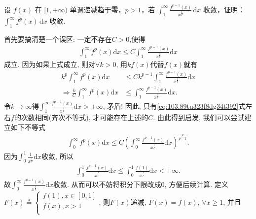\documentclass[../../main.tex]{subfiles}%
\begin{document}
\begin{example}
设 $f(x)$ 在 $[1,+\infty)$ 单调递减趋于零，$p>1$，若 $\int_{1}^{\infty}\frac{f^{p-1}(x)}{x^{\frac{1}{p}}}\,\mathrm{d}x$ 收敛，证明：$\int_{1}^{\infty}f^{p}(x)\,\mathrm{d}x$ 收敛.
\end{example}
\begin{note}
首先要搞清楚一个误区: 一定不存在$C>0$,使得
\begin{align}\label{eq:103.89tu323f8dg34t392}
\int_1^{\infty}{f^p\left( x \right)}\mathrm{d}x\leqslant C\int_1^{\infty}{\frac{f^{p-1}\left( x \right)}{x^{\frac{1}{p}}}\mathrm{d}x}
\end{align}
成立. 因为如果上式成立, 则对$\forall k>0$, 用$kf\left( x \right)$代替$f\left( x \right)$就有
\begin{align*}
k^p\int_1^{\infty}{f^p\left( x \right)}\mathrm{d}x&\leqslant Ck^{p-1}\int_1^{\infty}{\frac{f^{p-1}\left( x \right)}{x^{\frac{1}{p}}}\mathrm{d}x}\\
\Rightarrow \frac{k}{C}\int_1^{\infty}{f^p\left( x \right)}\mathrm{d}x&\leqslant \int_1^{\infty}{\frac{f^{p-1}\left( x \right)}{x^{\frac{1}{p}}}\mathrm{d}x}.
\end{align*}
令$k\rightarrow \infty$得$\int_1^{\infty}{\frac{f^{p-1}\left( x \right)}{x^{\frac{1}{p}}}\mathrm{d}x}>+\infty$, 矛盾!
因此, 只有\eqref{eq:103.89tu323f8dg34t392}式左右$f$的次数相同(齐次不等式), 才可能存在上述的$C$.
由此得到启发, 我们可以尝试建立如下不等式
\begin{align*}
\int_0^{\infty}{f^p\left( x \right)}\mathrm{d}x\leqslant C\left( \int_0^{\infty}{\frac{f^{p-1}\left( x \right)}{x^{\frac{1}{p}}}\mathrm{d}x} \right) ^{\frac{p}{p-1}}.
\end{align*}
因为$\int_0^1{\frac{1}{x^{\frac{1}{p}}}\mathrm{d}x}$收敛, 所以
\begin{align*}
\int_0^1{\frac{f^{p-1}\left( x \right)}{x^{\frac{1}{p}}}\mathrm{d}x}\leqslant \int_0^1{\frac{f\left( 1 \right)}{x^{\frac{1}{p}}}\mathrm{d}x}<+\infty .
\end{align*}
故$\int_0^{\infty}{\frac{f^{p-1}\left( x \right)}{x^{\frac{1}{p}}}\mathrm{d}x}$收敛. 从而可以不妨将积分下限改成$0$, 方便后续计算.
定义$F\left( x \right) \triangleq \begin{cases}
	f\left( 1 \right) ,x\in \left[ 0,1 \right]\\
	f\left( x \right) ,x>1\\
\end{cases}$, 则$F\left( x \right) $递减, $F\left( x \right) =f\left( x \right) $, $\forall x\geqslant 1$, 并且
\begin{align*}

\end{align*}
\end{note}
\end{document}
